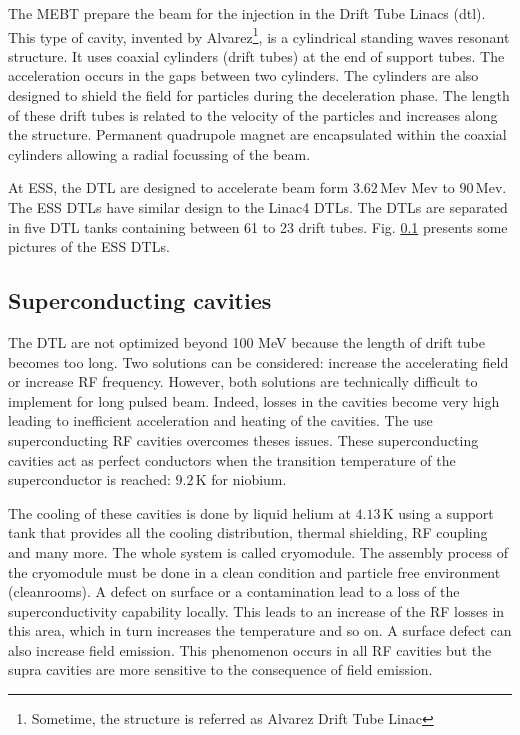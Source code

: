 \begin{refsection}
  

  The MEBT prepare the beam for the injection in the Drift Tube Linacs (\acrshort{dtl}).
  This type of cavity, invented by Alvarez\footnote{Sometime, the structure is referred as Alvarez Drift Tube Linac}, is a cylindrical standing waves resonant structure. It uses coaxial cylinders (drift tubes) at the end of support tubes. The acceleration occurs in the gaps between two cylinders. The cylinders are also designed to shield the field for particles during the deceleration phase. The length of these drift tubes is related to the velocity of the particles and increases along the structure. Permanent quadrupole magnet are encapsulated within the coaxial cylinders allowing a  radial focussing of the beam.

  At ESS, the DTL are designed to accelerate beam form $3.62\,\mathrm{Mev}$ Mev to $90\,\mathrm{Mev}$. The ESS DTLs have similar design to the Linac4 DTLs. The DTLs are separated in five DTL tanks containing between 61 to 23 drift tubes. Fig. \ref{} presents some pictures of the ESS DTLs.


  \subsection{Superconducting cavities}
  The DTL are not optimized beyond 100 MeV because the length of drift tube becomes too long. Two solutions can be considered: increase the accelerating field or increase RF frequency. However, both solutions are technically difficult to implement for long pulsed beam. Indeed, losses in the cavities become very high leading to inefficient acceleration and heating of the cavities. The use superconducting RF cavities overcomes theses issues. These superconducting cavities act as perfect conductors when the transition temperature of the superconductor is reached: $9.2\,\mathrm{K}$ for niobium.

  The cooling of these cavities is done by liquid helium at $4.13\,\mathrm{K}$ using a support tank that provides all the cooling distribution, thermal shielding, RF coupling and many more. The whole system is called cryomodule. The assembly process of the cryomodule must be done in a clean condition and particle free environment (cleanrooms). A defect on surface or a contamination lead to a loss of the superconductivity capability locally. This leads to an increase of the RF losses in this area, which in turn increases the temperature and so on. A surface defect can also increase field emission. This phenomenon occurs in all RF cavities but the supra cavities are more sensitive to the consequence of field emission.


\end{refsection}
